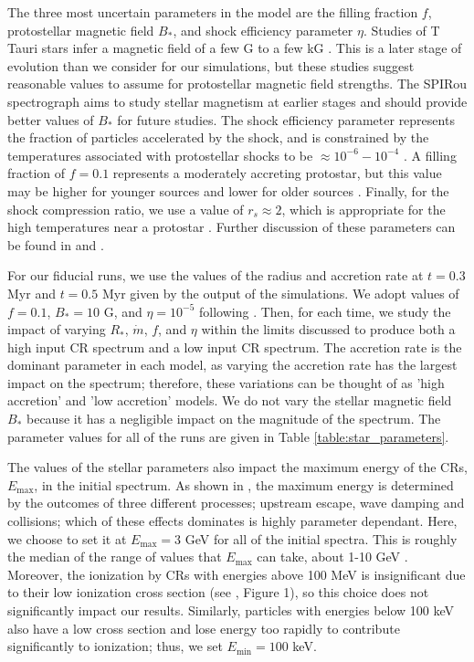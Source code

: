 \documentclass[twocolumn]{aastex63}
\def\t{\text}
\begin{document}
 The three most uncertain parameters in the model are the filling fraction $f$, protostellar magnetic field $B_*$, and shock efficiency parameter $\eta$. Studies of T Tauri stars infer a magnetic field of a few G to a few kG \citep{krull_2007_measurements, donati_2011_bfield, johnstone_2014_bfield}. This is a later stage of evolution than we consider for our simulations, but these studies suggest reasonable values to assume for protostellar magnetic field strengths. The SPIRou spectrograph \citep{spirou_2014} aims to study stellar magnetism at earlier stages and should provide better values of $B_*$ for future studies. The shock efficiency parameter represents the fraction of particles accelerated by the shock, and is constrained by the temperatures associated with protostellar shocks to be $\approx 10^{-6}- 10^{-4}$ \citep{padovani_2016_protostars}. A filling fraction of $f=0.1$ represents a moderately accreting protostar, but this value may be higher for younger sources and lower for older sources \citep{hartmann_2016_accretion}. Finally, for the shock compression ratio, we use a value of $r_s \approx 2$, which is appropriate for the high temperatures near a protostar \citep{padovani_2016_protostars}. Further discussion of these parameters can be found in \cite{gaches_2018_exploration} and \cite{padovani_2016_protostars}.
 
For our fiducial runs, we use the values of the radius and accretion rate at $t=0.3$ Myr and $t=0.5$ Myr given by the output of the \cite{offner_2017_impact} simulations. We adopt values of $f=0.1$, $B_*=10$ G, and $\eta=10^{-5}$ following \cite{gaches_2018_exploration}. Then, for each time, we study the impact of varying $R_*$, $\dot{m}$, $f$, and $\eta$ within the limits discussed to produce both a high input CR spectrum and a low input CR spectrum. The accretion rate is the dominant parameter in each model, as varying the accretion rate has the largest impact on the spectrum; therefore, these variations can be thought of as 'high accretion' and 'low accretion' models. We do not vary the stellar magnetic field $B_*$ because it has a negligible impact on the magnitude of the spectrum. The parameter values for all of the runs are given in Table \ref{table:star_parameters}.

The values of the stellar parameters also impact the maximum energy of the CRs, $E_\t{max}$, in the initial spectrum. As shown in \cite{gaches_2018_exploration}, the maximum energy is determined by the outcomes of three different processes; upstream escape, wave damping and collisions; which of these effects dominates is highly parameter dependant. Here, we choose to set it at $E_{\t{max}}=3$ GeV for all of the initial spectra. This is roughly the median of the range of values that $E_{\t{max}}$ can take, about 1-10 GeV \citep{gaches_2018_exploration}. Moreover, the ionization by CRs with energies above 100 MeV is insignificant due to their low ionization cross section (see \cite{padovani_2009_cosmic}, Figure 1), so this choice does not significantly impact our results. Similarly, particles with energies below 100 keV also have a low cross section \citep{padovani_2009_cosmic} and lose energy too rapidly to contribute significantly to ionization; thus, we set $E_{\t{min}}= 100$ keV.  
\end{document}
